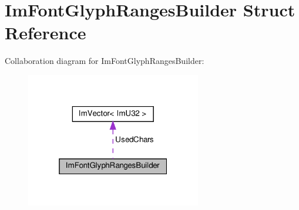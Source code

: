\hypertarget{structImFontGlyphRangesBuilder}{}\section{Im\+Font\+Glyph\+Ranges\+Builder Struct Reference}
\label{structImFontGlyphRangesBuilder}


Collaboration diagram for Im\+Font\+Glyph\+Ranges\+Builder\+:\nopagebreak
\begin{figure}[H]
\begin{center}
\leavevmode
\includegraphics[width=217pt]{structImFontGlyphRangesBuilder__coll__graph}
\end{center}
\end{figure}
